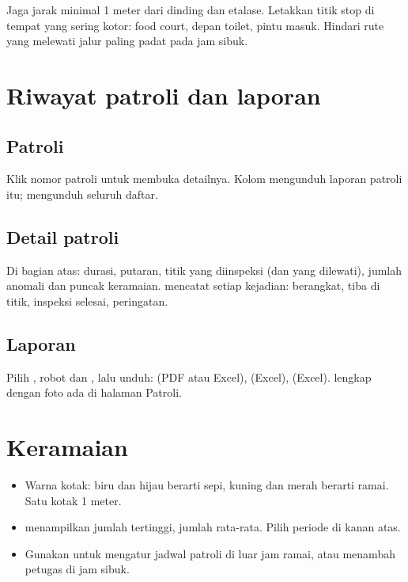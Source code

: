 \documentclass[11pt]{article}
\begin{document}
\begin{tips}
Jaga jarak minimal 1 meter dari dinding dan etalase. Letakkan titik stop di tempat yang sering kotor:
food court, depan toilet, pintu masuk. Hindari rute yang melewati jalur paling padat pada jam sibuk.
\end{tips}

\clearpage
\section{Riwayat patroli dan laporan}

\subsection{Patroli}
Klik nomor patroli untuk membuka detailnya. Kolom  mengunduh laporan patroli itu;  mengunduh seluruh daftar.

\subsection{Detail patroli}
Di bagian atas: durasi, putaran, titik yang diinspeksi (dan yang dilewati), jumlah anomali dan puncak
keramaian.  mencatat setiap kejadian: berangkat, tiba di titik, inspeksi selesai,
peringatan.

\subsection{Laporan}
Pilih , robot dan , lalu unduh:  (PDF atau
Excel),  (Excel),  (Excel).  lengkap
dengan foto ada di halaman Patroli.

\clearpage
\section{Keramaian}
\begin{itemize}
  \item Warna kotak: biru dan hijau berarti sepi, kuning dan merah berarti ramai. Satu kotak 1 meter.
  \item {} menampilkan jumlah tertinggi,  jumlah rata-rata. Pilih periode di
        kanan atas.
  \item Gunakan untuk mengatur jadwal patroli di luar jam ramai, atau menambah petugas di jam sibuk.
\end{itemize}
\end{document}
